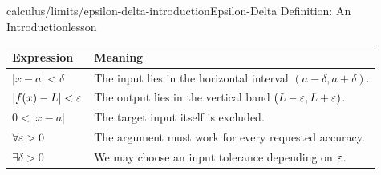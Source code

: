 \begin{webpage}{calculus/limits/epsilon-delta-introduction}{Epsilon-Delta Definition: An Introduction}{lesson}
\begin{center}
\begin{tabularx}{0.9\textwidth}{@{}p{}X@{}}
\toprule
\textbf{Expression} & \textbf{Meaning}\\
\midrule
\(|x-a|<\delta\) & The input lies in the horizontal interval \((a-\delta,a+\delta)\).\\
\(|f(x)-L|<\varepsilon\) & The output lies in the vertical band \((L-\varepsilon,L+\varepsilon)\).\\
\(0<|x-a|\) & The target input itself is excluded.\\
\(\forall\varepsilon>0\) & The argument must work for every requested accuracy.\\
\(\exists\delta>0\) & We may choose an input tolerance depending on \(\varepsilon\).\\
\bottomrule
\end{tabularx}
\end{center}
\end{webpage}

